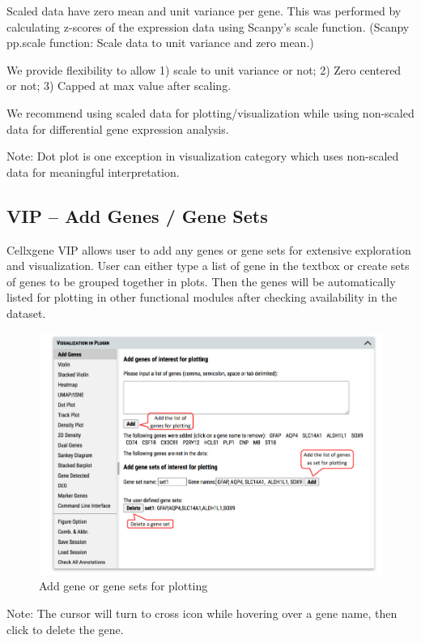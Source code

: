 \documentclass[
]{article}
\begin{document}
Scaled data have zero mean and unit variance per gene. This was performed by calculating z-scores of the expression data using Scanpy's scale function. (Scanpy pp.scale function: Scale data to unit variance and zero mean.)

We provide flexibility to allow 1) scale to unit variance or not; 2) Zero centered or not; 3) Capped at max value after scaling.

We recommend using scaled data for plotting/visualization while using non-scaled data for differential gene expression analysis.

Note: Dot plot is one exception in visualization category which uses non-scaled data for meaningful interpretation.

\hypertarget{vip-add-genes-gene-sets}{%
\subsection{VIP -- Add Genes / Gene Sets}\label{vip-add-genes-gene-sets}}

Cellxgene VIP allows user to add any genes or gene sets for extensive exploration and visualization. User can either type a list of gene in the textbox or create sets of genes to be grouped together in plots. Then the genes will be automatically listed for plotting in other functional modules after checking availability in the dataset.

\begin{figure}
\centering
\includegraphics{figures/F6.jpg}
\caption{Add gene or gene sets for plotting}
\end{figure}

Note: The cursor will turn to cross icon while hovering over a gene name, then click to delete the gene.
\end{document}
